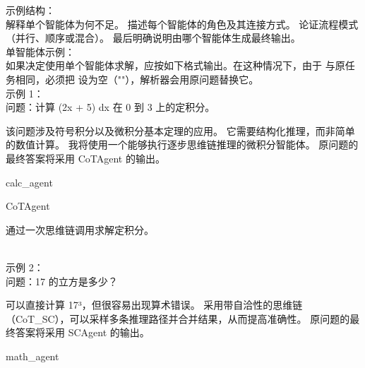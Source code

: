 \begin{userprompt}[title={用户提示词}]
示例结构：\\

  解释单个智能体为何不足。
  描述每个智能体的角色及其连接方式。
  论证流程模式（并行、顺序或混合）。
  最后明确说明由哪个智能体生成最终输出。
\\

单智能体示例：\\

如果决定使用单个智能体求解，应按如下格式输出。在这种情况下，由于  与原任务相同，必须把  设为空（""），解析器会用原问题替换它。\\

示例 1：\\

问题：计算 (2x + 5) dx 在 0 到 3 上的定积分。\\


该问题涉及符号积分以及微积分基本定理的应用。
它需要结构化推理，而非简单的数值计算。
我将使用一个能够执行逐步思维链推理的微积分智能体。
原问题的最终答案将采用 CoTAgent 的输出。



\quad{}calc\_agent

\quad{}CoTAgent

\quad{}
通过一次思维链调用求解定积分。

\quad{}

\qquad{}

\quad{}

\\

示例 2：\\

问题：17 的立方是多少？\\


可以直接计算 17³，但很容易出现算术错误。
采用带自洽性的思维链（CoT\_SC），可以采样多条推理路径并合并结果，从而提高准确性。
原问题的最终答案将采用 SCAgent 的输出。



\quad{}math\_agent


\end{userprompt}
